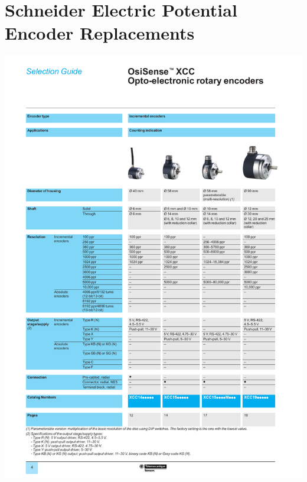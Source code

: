 \section{Schneider Electric Potential Encoder Replacements}
\begin{center}
	\includegraphics[width=6.5in,angle=0]{afiles/9006CT1101 Encoders.pdf}
\end{center}